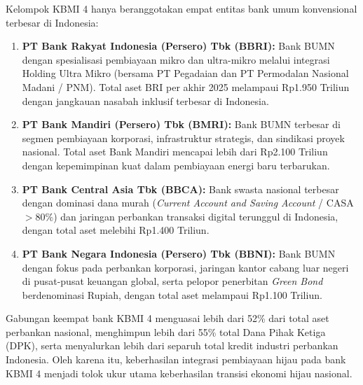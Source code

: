 \documentclass[12pt,a4paper]{article}
\numberwithin{equation}{section}
\begin{document}
\noindent
Kelompok KBMI 4 hanya beranggotakan empat entitas bank umum konvensional terbesar di Indonesia:
\begin{enumerate}
  \item \textbf{PT Bank Rakyat Indonesia (Persero) Tbk (BBRI):} Bank BUMN dengan spesialisasi pembiayaan mikro dan ultra-mikro melalui integrasi Holding Ultra Mikro (bersama PT Pegadaian dan PT Permodalan Nasional Madani / PNM). Total aset BRI per akhir 2025 melampaui Rp1.950 Triliun dengan jangkauan nasabah inklusif terbesar di Indonesia.
  \item \textbf{PT Bank Mandiri (Persero) Tbk (BMRI):} Bank BUMN terbesar di segmen pembiayaan korporasi, infrastruktur strategis, dan sindikasi proyek nasional. Total aset Bank Mandiri mencapai lebih dari Rp2.100 Triliun dengan kepemimpinan kuat dalam pembiayaan energi baru terbarukan.
  \item \textbf{PT Bank Central Asia Tbk (BBCA):} Bank swasta nasional terbesar dengan dominasi dana murah (\emph{Current Account and Saving Account} / CASA $>80\%$) dan jaringan perbankan transaksi digital terunggul di Indonesia, dengan total aset melebihi Rp1.400 Triliun.
  \item \textbf{PT Bank Negara Indonesia (Persero) Tbk (BBNI):} Bank BUMN dengan fokus pada perbankan korporasi, jaringan kantor cabang luar negeri di pusat-pusat keuangan global, serta pelopor penerbitan \emph{Green Bond} berdenominasi Rupiah, dengan total aset melampaui Rp1.100 Triliun.
\end{enumerate}

\noindent
Gabungan keempat bank KBMI 4 menguasai lebih dari 52\% dari total aset perbankan nasional, menghimpun lebih dari 55\% total Dana Pihak Ketiga (DPK), serta menyalurkan lebih dari separuh total kredit industri perbankan Indonesia. Oleh karena itu, keberhasilan integrasi pembiayaan hijau pada bank KBMI 4 menjadi tolok ukur utama keberhasilan transisi ekonomi hijau nasional.
\end{document}
